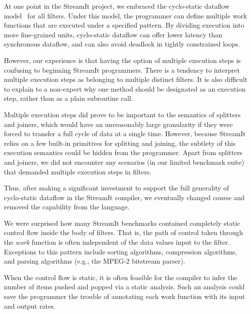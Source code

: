  At one point in the StreamIt project, we embraced the
  cyclo-static dataflow
  model~\cite{bilsen_cyclo-static_1995,parks_comparison_1995} for all
  filters.  Under this model, the programmer can define multiple work
  functions that are executed under a specified pattern.  By dividing
  execution into more fine-grained units, cyclo-static dataflow can
  offer lower latency than synchronous dataflow, and can also avoid
  deadlock in tightly constrained loops.

  However, our experience is that having the option of multiple
  execution steps is confusing to beginning StreamIt programmers.
  There is a tendency to interpret multiple execution steps as
  belonging to multiple distinct filters.  It is also difficult to
  explain to a non-expert why one method should be designated as an
  execution step, rather than as a plain subroutine call.

  Multiple execution steps did prove to be important to the semantics
  of splitters and joiners, which would have an unreasonably large
  granularity if they were forced to transfer a full cycle of data at
  a single time.  However, because StreamIt relies on a few built-in
  primitives for splitting and joining, the subtlety of this execution
  semantics could be hidden from the programmer.  Apart from splitters
  and joiners, we did not encounter any scenarios (in our limited
  benchmark suite) that demanded multiple execution steps in filters.

  Thus, after making a significant investment to support the full
  generality of cyclo-static dataflow in the StreamIt compiler, we
  eventually changed course and removed the capability from the
  language.

  We were surprised how many StreamIt
  benchmarks contained completely static control flow inside the body
  of filters.  That is, the path of control taken through the {\it
    work} function is often independent of the data values input to
  the filter.  Exceptions to this pattern include sorting algorithms,
  compression algorithms, and parsing algorithms (e.g., the MPEG-2
  bitstream parser).

  When the control flow is static, it is often feasible for the
  compiler to infer the number of items pushed and popped via a static
  analysis.  Such an analysis could save the programmer the trouble of
  annotating each work function with its input and output rates.

